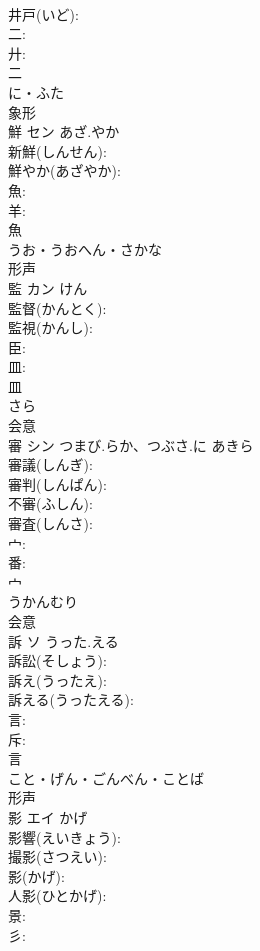 \documentclass[8pt]{extreport}
\begin{document}
\begin{CJK}{UTF8}{min}
\\	井戸(いど): 
\\	二: 
\\	廾: 
\\	二	
\\	に・ふた	
\\	象形 
\\	鮮	セン	あざ.やか		
\\	新鮮(しんせん): 
\\	鮮やか(あざやか): 
\\	魚: 
\\	羊: 
\\	魚	
\\	うお・うおへん・さかな	
\\	形声 
\\	監	カン		けん	
\\	監督(かんとく): 
\\	監視(かんし): 
\\	臣: 
\\	皿: 
\\	皿	
\\	さら	
\\	会意 
\\	審	シン	つまび.らか、つぶさ.に	あきら	
\\	審議(しんぎ): 
\\	審判(しんぱん): 
\\	不審(ふしん): 
\\	審査(しんさ): 
\\	宀: 
\\	番: 
\\	宀	
\\	うかんむり	
\\	会意 
\\	訴	ソ	うった.える		
\\	訴訟(そしょう): 
\\	訴え(うったえ): 
\\	訴える(うったえる): 
\\	言: 
\\	斥: 
\\	言	
\\	こと・げん・ごんべん・ことば	
\\	形声 
\\	影	エイ	かげ		
\\	影響(えいきょう): 
\\	撮影(さつえい): 
\\	影(かげ): 
\\	人影(ひとかげ): 
\\	景: 
\\	彡: 

\end{CJK}
\end{document}
